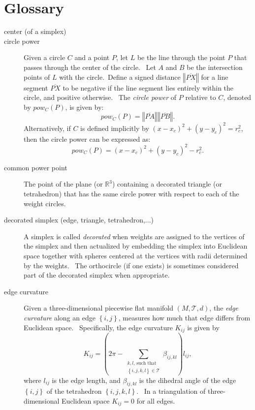                       


\chapter{Glossary}

\begin{description}
\item[center (of a simplex)] 

\item[circle power] Given a circle $C$ and a point $P$, let $L$ be the line
through the point $P$ that passes through the center of the circle. \ Let $A$
and $B$ be the intersection points of $L$ with the circle.\ Define a signed
distance $\left\Vert \overline{PX}\right\Vert $ for a line segment $%
\overline{PX}$ to be negative if the line segment lies entirely within the
circle, and positive otherwise. \ The \textit{circle power} of $P$ relative
to $C$, denoted by $pow_{C}\left( P\right) $, is given by:%
\[
pow_{C}\left( P\right) =\left\Vert \overline{PA}\right\Vert \left\Vert 
\overline{PB}\right\Vert . 
\]%
Alternatively, if $C$ is defined implicitly by $\left( x-x_{c}\right)
^{2}+\left( y-y_{c}\right) ^{2}=r_{c}^{2}$, then the circle power can be
expressed as:%
\[
pow_{C}\left( P\right) =\left( x-x_{c}\right) ^{2}+\left( y-y_{c}\right)
^{2}-r_{c}^{2}. 
\]

\item[common power point] The point of the plane (or $%
\mathbb{R}
^{3}$) containing a decorated triangle (or tetrahedron) that has the same
circle power with respect to each of the weight circles. \ 

\item[decorated simplex (edge, triangle, tetrahedron,...)] A simplex is
called \textit{decorated} when weights are assigned to the vertices of the
simplex and then actualized by embedding the simplex into Euclidean space
together with spheres centered at the vertices with radii determined by the
weights. \ The orthocircle (if one exists) is sometimes considered part of
the decorated simplex when appropriate.

\item[edge curvature] Given a three-dimensional piecewise flat manifold $%
\left( M,\mathcal{T},d\right) $, the \textit{edge curvature} along an edge $%
\left\{ i,j\right\} $, measures how much that edge differs from Euclidean
space. \ Specifically, the edge curvature $K_{ij}$ is given by 
\[
K_{ij}=\left( 2\pi -\sum\limits_{\substack{ k,l\text{, such that}  \\ %
\left\{ i,j,k,l\right\} \in \mathcal{T}}}\beta _{ij,kl}\right) l_{ij}, 
\]%
where $l_{ij}$ is the edge length, and $\beta _{ij,kl}$ is the dihedral
angle of the edge $\left\{ i,j\right\} $ of the tetrahedron $\left\{
i,j,k,l\right\} $. \ In a triangulation of three-dimensional Euclidean space 
$K_{ij}=0$ for all edges. \ 


\end{description}
